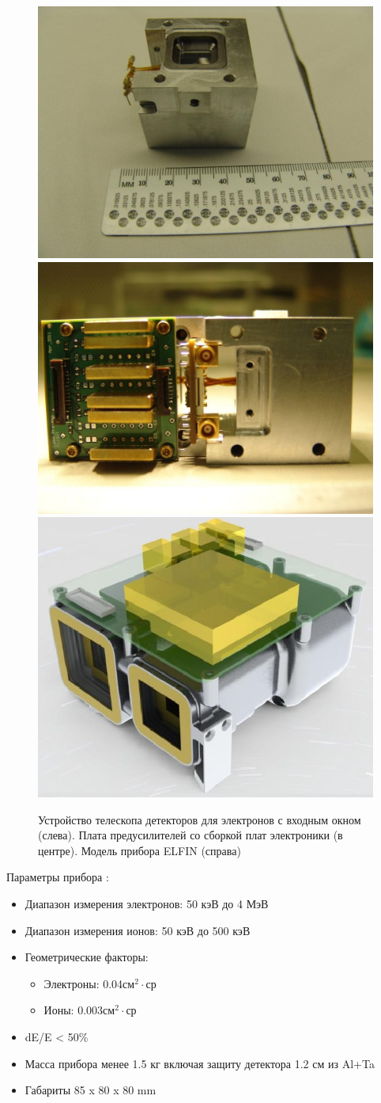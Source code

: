 \begin{figure}
	\centering
	\includegraphics[width=0.33\linewidth]{images/elfin/DSC04260}
	\includegraphics[width=0.33\linewidth]{images/elfin/DSC04287}
	\includegraphics[width=0.32\linewidth]{images/EPD_Brochure}
	\caption{Устройство телескопа детекторов для электронов с входным окном (слева). 	Плата предусилителей со сборкой плат электроники (в центре). Модель прибора ELFIN (справа) }
	\label{fig:dsc04260}
\end{figure}


Параметры прибора :
\begin{itemize}
	\item Диапазон измерения электронов: 50 кэВ до 4 МэВ
	
	\item Диапазон измерения ионов: 50 кэВ до 500 кэВ
	
	\item Геометрические факторы:
	
	\begin{itemize}
		\item Электроны: 0.04см$ ^{2}\cdot $ср
		
		\item Ионы: 0.003см$ ^{2}\cdot $ср
	\end{itemize}
	
	
	\item dE/E < 50\%
	
	\item Масса прибора менее 1.5 кг включая защиту детектора 1.2 см из Al+Ta
	
	\item Габариты 85 x 80 x 80 mm
\end{itemize}

